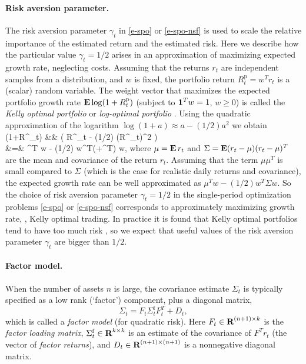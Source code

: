 \documentclass[openany]{article}  %
\newcommand{\Rp}{R^\mathrm{p}}
\begin{document}
\paragraph{Risk aversion parameter.}
The risk aversion parameter $\gamma_t$ in \eqref{e-spo} or \eqref{e-spo-nsf}
is used to scale the relative importance of the estimated return and the estimated
risk.  Here we describe how the particular value $\gamma_t=1/2$
arises in an approximation of maximizing expected growth rate, neglecting
costs.
Assuming that the returns $r_t$ are independent samples from a distribution,
and $w$ is fixed, the portfolio return $\Rp_t =w^Tr_t$ is a (scalar) random variable.
The weight vector that maximizes the expected portfolio growth rate
$\Expect \log (1+ \Rp_t)$ (subject to $\mathbf 1^Tw=1$, $w \geq 0$) is called
the \emph{Kelly optimal portfolio} or \emph{log-optimal portfolio} \cite{kelly1956new,busseti2016risk}.
Using the quadratic approximation of the logarithm
$\log(1+a) \approx a- (1/2)a^2$ we obtain
\BEAS
\Expect \log (1+\Rp_t) &\approx& \Expect \left( \Rp_t - (1/2) (\Rp_t)^2 \right)\\
&=& \mu^T w - (1/2) w^T(\Sigma+\mu\mu^T) w,
\EEAS
where $\mu=\mathop{\bf E{}} r_t$ and $\Sigma=\mathop{\bf E{}}(r_t-\mu)(r_t-\mu)^T$
are the mean and covariance of the return $r_t$.
Assuming that the term $\mu \mu^T$ is small compared to $\Sigma$
(which is the case for realistic daily returns and covariance),
the expected growth rate can be well approximated as
$\mu^T w -(1/2) w^T \Sigma w$.
So the choice of risk aversion parameter $\gamma_t = 1/2$
in the single-period optimization problems
\eqref{e-spo} or \eqref{e-spo-nsf}
corresponds to approximately maximizing growth rate, \ie,
Kelly optimal trading.   In practice it is found that
Kelly optimal portfolios tend to have too much risk \cite{busseti2016risk},
so we expect that useful values of
the risk aversion parameter $\gamma_t$ are bigger than $1/2$.

\paragraph{Factor model.}
When the number of assets $n$ is large,
the covariance estimate $\Sigma_t$ is typically specified
as a low rank (`factor') component, plus a diagonal matrix,
\[
\Sigma_t = F_t \Sigma_t^\mathrm{f} F_t^T + D_t,
\]
which is called a \emph{factor model} (for quadratic risk).
Here $F_t \in {\mbox{\bf R}}^{(n+1)\times k}$ is the \emph{factor loading matrix},
$\Sigma_t^\mathrm{f} \in {\mbox{\bf R}}^{k \times k}$ is an estimate of the covariance of $F^Tr_t$
(the vector of \emph{factor returns}),
and $D_t \in {\mbox{\bf R}}^{(n+1)\times (n+1)}$ is a nonnegative diagonal matrix.
\end{document}
